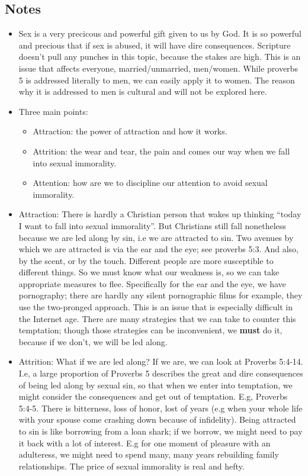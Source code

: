 \subsection*{Notes}
\begin{itemize}
  \item{Sex is a very precicous and powerful gift given to us by God.  It is
  so powerful and precious that if sex is abused, it will have dire
  consequences.  Scripture doesn't pull any punches in this topic, because
  the stakes are high.  This is an issue that affects everyone,
  married/unmarried, men/women. While proverbs 5 is addressed literally to men, we can easily apply it to women. The reason why it is addressed to men is cultural and will not be explored here.}
  \item{Three main points:
  \begin{itemize}
    \item{Attraction: the power of attraction and how it works.}
    \item{Attrition: the wear and tear, the pain and comes our way when we
    fall into sexual immorality.}
    \item{Attention: how are we to discipline our attention to avoid sexual
    immorality.}
  \end{itemize}}
  \item{Attraction: There is hardly a Christian person that wakes up thinking
  ``today I want to fall into sexual immorality''.  But Christians still fall
  nonetheless because we are led along by sin, i.e we are attracted to sin.
  Two avenues by which we are attracted is via the ear and the eye; see
  proverbs 5:3.  And also, by the scent, or by the touch.  Different people
  are more susceptible to different things.  So we must know what our
  weakness is, so we can take appropriate measures to flee.  Specifically for
  the ear and the eye, we have pornography; there are hardly any silent
  pornographic films for example, they use the two-pronged approach.  This is
  an issue that is especially difficult in the Internet age.  There are many
  strategies that we can take to counter this temptation; though those
  strategies can be inconvenient, we \textbf{must} do it, because if we
  don't, we will be led along.}
  \item{Attrition: What if we are led along?  If we are, we can look at
  Proverbs 5:4-14.  I.e, a large proportion of Proverbs 5 describes the great
  and dire consequences of being led along by sexual sin, so that when we
  enter into temptation, we might consider the consequences and get out of
  temptation.  E.g, Proverbs 5:4-5.  There is bitterness, loss of honor, lost
  of years (e.g when your whole life with your spouse come crashing down
  because of infidelity).  Being attracted to sin is like borrowing from a
  loan shark; if we borrow, we might need to pay it back with a lot of
  interest.  E.g for one moment of pleasure with an adulteress, we might need
  to spend many, many years rebuilding family relationships. The price of sexual immorality is real and hefty.
  
}
\end{itemize}
